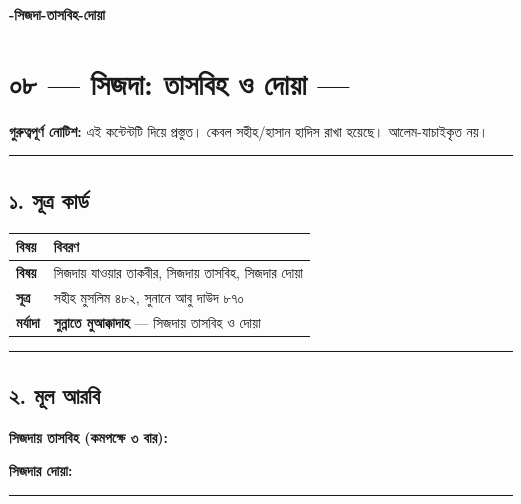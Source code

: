 

\begin{center}{\Large\bfseries\color{emerald} -সিজদা-তাসবিহ-দোয়া}\end{center}
\vspace{1em}
\section*{০৮ — সিজদা: তাসবিহ ও দোয়া — \textit{  }}

\begin{warnbox}
 \textbf{গুরুত্বপূর্ণ নোটিশ:} এই কন্টেন্টটি  দিয়ে প্রস্তুত। কেবল সহীহ/হাসান হাদিস রাখা হয়েছে। আলেম-যাচাইকৃত নয়।
\end{warnbox}

\medskip\hrule\medskip

\subsection*{১. সূত্র কার্ড}

\begin{table}[h]\centering\small
\begin{tabular}{ll}
বিষয় & বিবরণ \\
\hline
\textbf{বিষয়} & সিজদায় যাওয়ার তাকবীর, সিজদায় তাসবিহ, সিজদার দোয়া \\
\textbf{সূত্র} & সহীহ মুসলিম ৪৮২, সুনানে আবু দাউদ ৮৭০ \\
\textbf{মর্যাদা} & \textbf{সুন্নাতে মুআক্কাদাহ} — সিজদায় তাসবিহ ও দোয়া \\
\hline
\end{tabular}
\end{table}

\medskip\hrule\medskip

\subsection*{২. মূল আরবি}

\textbf{সিজদায় তাসবিহ (কমপক্ষে ৩ বার):}
\begin{center}\end{center}

\textbf{সিজদার দোয়া:}
\begin{center}\end{center}

\medskip\hrule\medskip

